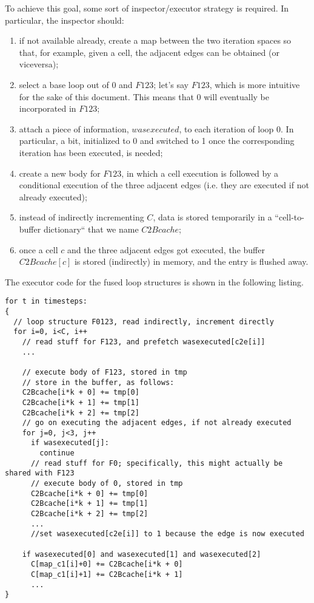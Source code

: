 \documentclass[a4paper]{article}
\begin{document}
To achieve this goal, some sort of inspector/executor strategy is required. In particular, the inspector should:
\begin{enumerate}
\item if not available already, create a map between the two iteration spaces so that, for example, given a cell, the adjacent edges can be obtained (or viceversa);
\item select a base loop out of $0$ and $F123$; let's say $F123$, which is more intuitive for the sake of this document. This means that $0$ will eventually be incorporated in $F123$;
\item attach a piece of information, $wasexecuted$, to each iteration of loop $0$. In particular, a bit, initialized to 0 and switched to 1 once the corresponding iteration has been executed, is needed;
\item create a new body for $F123$, in which a cell execution is followed by a conditional execution of the three adjacent edges (i.e. they are executed if not already executed);
\item instead of indirectly incrementing $C$, data is stored temporarily in a ``cell-to-buffer dictionary`` that we name $C2Bcache$;
\item once a cell $c$ and the three adjacent edges got executed, the buffer $C2Bcache[c]$ is stored (indirectly) in memory, and the entry is flushed away.
\end{enumerate}

The executor code for the fused loop structures is shown in the following listing.


\begin{footnotesize}
\begin{lstlisting}
for t in timesteps:
{ 
  // loop structure F0123, read indirectly, increment directly
  for i=0, i<C, i++
    // read stuff for F123, and prefetch wasexecuted[c2e[i]]
    ...

	// execute body of F123, stored in tmp
	// store in the buffer, as follows:
    C2Bcache[i*k + 0] += tmp[0]
    C2Bcache[i*k + 1] += tmp[1]
    C2Bcache[i*k + 2] += tmp[2]
    // go on executing the adjacent edges, if not already executed
    for j=0, j<3, j++
      if wasexecuted[j]:
        continue
      // read stuff for F0; specifically, this might actually be shared with F123
      // execute body of 0, stored in tmp
      C2Bcache[i*k + 0] += tmp[0]
      C2Bcache[i*k + 1] += tmp[1]
      C2Bcache[i*k + 2] += tmp[2]
      ...
      //set wasexecuted[c2e[i]] to 1 because the edge is now executed
      
    if wasexecuted[0] and wasexecuted[1] and wasexecuted[2]
      C[map_c1[i]+0] += C2Bcache[i*k + 0]
      C[map_c1[i]+1] += C2Bcache[i*k + 1]
      ...
}
\end{lstlisting}
\end{footnotesize}
\end{document}

